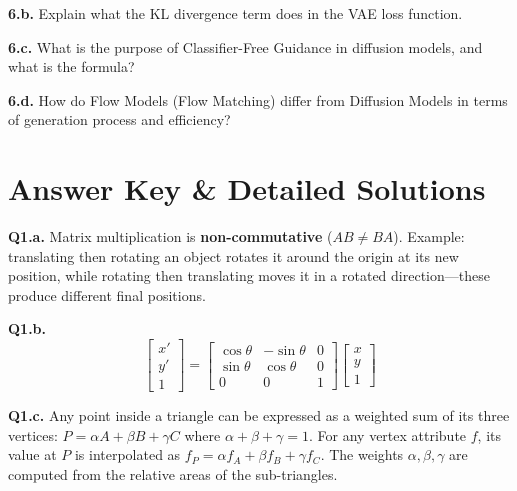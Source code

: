 \documentclass[11pt]{article}
\begin{document}
\vspace{2cm}

\textbf{6.b.} Explain what the KL divergence term does in the VAE loss function.

\vspace{2cm}

\textbf{6.c.} What is the purpose of Classifier-Free Guidance in diffusion models, and what is the formula?

\vspace{2.5cm}

\textbf{6.d.} How do Flow Models (Flow Matching) differ from Diffusion Models in terms of generation process and efficiency?

\vspace{2cm}

\newpage
\section*{Answer Key \& Detailed Solutions}

\vspace{0.5em}

\textbf{Q1.a.} Matrix multiplication is \textbf{non-commutative} ($AB \neq BA$). Example: translating then rotating an object rotates it around the origin at its new position, while rotating then translating moves it in a rotated direction—these produce different final positions.

\vspace{0.75em}
\textbf{Q1.b.}
$$\begin{bmatrix} x' \\ y' \\ 1 \end{bmatrix} = \begin{bmatrix} \cos\theta & -\sin\theta & 0 \\ \sin\theta & \cos\theta & 0 \\ 0 & 0 & 1 \end{bmatrix} \begin{bmatrix} x \\ y \\ 1 \end{bmatrix}$$

\vspace{0.75em}
\textbf{Q1.c.} Any point inside a triangle can be expressed as a weighted sum of its three vertices: $P = \alpha A + \beta B + \gamma C$ where $\alpha+\beta+\gamma=1$. For any vertex attribute $f$, its value at $P$ is interpolated as $f_P = \alpha f_A + \beta f_B + \gamma f_C$. The weights $\alpha,\beta,\gamma$ are computed from the relative areas of the sub-triangles.
\end{document}
